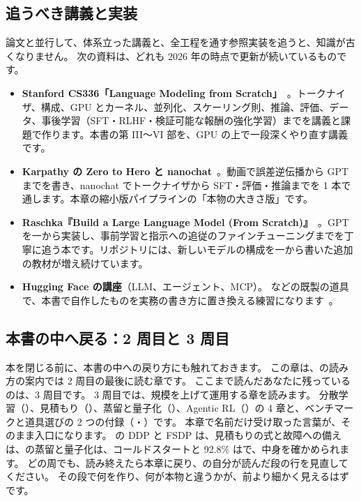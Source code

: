 \subsection*{追うべき講義と実装}

論文と並行して、体系立った講義と、全工程を通す参照実装を追うと、知識が古くなりません。
次の資料は、どれも 2026 年の時点で更新が続いているものです。

\begin{itemize}
\item \textbf{Stanford CS336「Language Modeling from Scratch」}~\cite{cs336}。トークナイザ、構成、GPU とカーネル、並列化、スケーリング則、推論、評価、データ、事後学習（SFT・RLHF・検証可能な報酬の強化学習）までを講義と課題で作ります。本書の第 III〜VI 部を、GPU の上で一段深くやり直す講義です。
\item \textbf{Karpathy の Zero to Hero と nanochat}~\cite{karpathy2022zerotohero,karpathy2025nanochat}。動画で誤差逆伝播から GPT までを書き、nanochat でトークナイザから SFT・評価・推論までを 1 本で通します。本章の縮小版パイプラインの「本物の大きさ版」です。
\item \textbf{Raschka『Build a Large Language Model (From Scratch)』}~\cite{raschka2024build}。GPT を一から実装し、事前学習と指示への追従のファインチューニングまでを丁寧に追う本です。リポジトリには、新しいモデルの構成を一から書いた追加の教材が増え続けています。
\item \textbf{Hugging Face の講座}（LLM、エージェント、MCP）。 などの既製の道具で、本書で自作したものを実務の書き方に置き換える練習になります~\cite{wolf2020transformers}。
\end{itemize}

\subsection*{本書の中へ戻る：2 周目と 3 周目}

本を閉じる前に、本書の中への戻り方にも触れておきます。
この章は、の読み方の案内では 2 周目の最後に読む章です。
ここまで読んだあなたに残っているのは、3 周目です。
3 周目では、規模を上げて運用する章を読みます。
分散学習（）、見積もり（）、蒸留と量子化（）、Agentic RL（）の 4 章と、ベンチマークと道具選びの 2 つの付録（・）です。
本章で名前だけ受け取った言葉が、そのまま入口になります。
の DDP と FSDP は、見積もりの式と故障への備えは、の蒸留と量子化は、コールドスタートと 92.8\% はで、中身を確かめられます。
どの周でも、読み終えたら本章に戻り、の自分が読んだ段の行を見直してください。
その段で何を作り、何が本物と違うかが、前より細かく見えるはずです。

